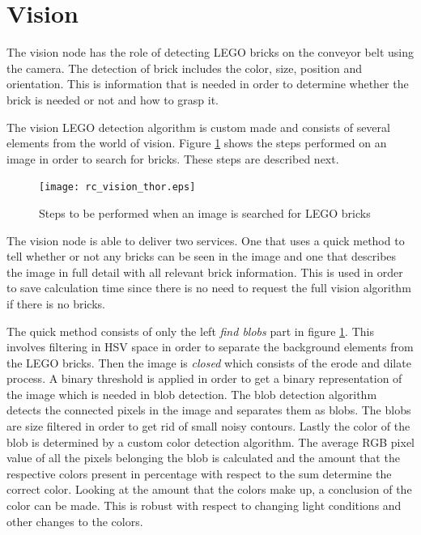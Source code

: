 \section{Vision}
\label{sec:rc_hmi_sec}
The vision node has the role of detecting LEGO bricks on the conveyor belt using the camera. The detection of brick includes the color, size, position and orientation. This is information that is needed in order to determine whether the brick is needed or not and how to grasp it. 

The vision LEGO detection algorithm is custom made and consists of several elements from the world of vision. Figure \ref{fig:rc_vision_steps_thor} shows the steps performed on an image in order to search for bricks. These steps are described next.\\
	
	\begin{figure}[H]
		\centering
	    \texttt{[image: rc\_vision\_thor.eps]}
	    \caption{Steps to be performed when an image is searched for LEGO bricks}
		\label{fig:rc_vision_steps_thor}
	\end{figure}
	
The vision node is able to deliver two services. One that uses a quick method to tell whether or not any bricks can be seen in the image and one that describes the image in full detail with all relevant brick information. This is used in order to save calculation time since there is no need to request the full vision algorithm if there is no bricks.

The quick method consists of only the left \textit{find blobs} part in figure \ref{fig:rc_vision_steps_thor}. This involves filtering in HSV space in order to separate the background elements from the LEGO bricks. Then the image is \textit{closed} which consists of the erode and dilate process. A binary threshold is applied in order to get a binary representation of the image which is needed in blob detection. The blob detection algorithm detects the connected pixels in the image and separates them as blobs. The blobs are size filtered in order to get rid of small noisy contours. Lastly the color of the blob is determined by a custom color detection algorithm. The average RGB pixel value of all the pixels belonging the blob is calculated and the amount that the respective colors present in percentage with respect to the sum determine the correct color. Looking at the amount that the colors make up, a conclusion of the color can be made. This is robust with respect to changing light conditions and other changes to the colors. 

